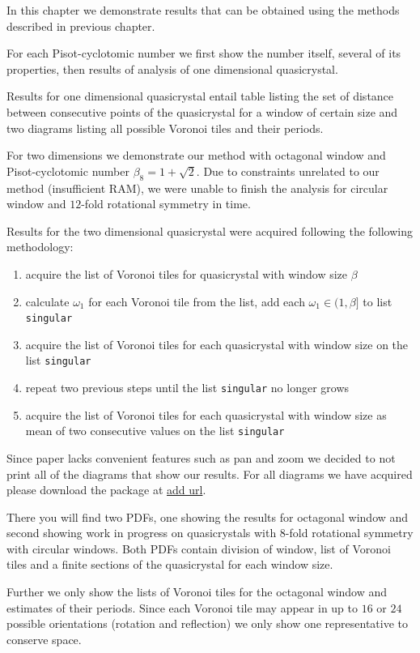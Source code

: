 \documentclass[text.tex]{subfiles}
\begin{document}
In this chapter we demonstrate results that can be obtained using the methods described in previous chapter. 

For each Pisot-cyclotomic number we first show the number itself, several of its properties, then results of analysis of one dimensional quasicrystal.

Results for one dimensional quasicrystal entail table listing the set of distance between consecutive points of the quasicrystal for a window of certain size and two diagrams listing all possible Voronoi tiles and their periods. 

For two dimensions we demonstrate our method with octagonal window and Pisot-cyclotomic number $\beta_8 = 1+\sqrt{2}$. Due to constraints unrelated to our method (insufficient RAM), we were unable to finish the analysis for circular window and $12$-fold rotational symmetry in time. 

Results for the two dimensional quasicrystal were acquired following the following methodology:
\begin{enumerate}
\item acquire the list of Voronoi tiles for quasicrystal with window size $\beta$
\item calculate $\omega_1$ for each Voronoi tile from the list, add each $\omega_1\in(1,\beta]$ to list \texttt{singular}
\item acquire the list of Voronoi tiles for each quasicrystal with window size on the list \texttt{singular}
\item repeat two previous steps until the list \texttt{singular} no longer grows
\item acquire the list of Voronoi tiles for each quasicrystal with window size as mean of two consecutive values on the list \texttt{singular}
\end{enumerate}

Since paper lacks convenient features such as pan and zoom we decided to not print all of the diagrams that show our results. For all diagrams we have acquired please download the package at \url{add url}. 

There you will find two PDFs, one showing the results for octagonal window and second showing work in progress on quasicrystals with $8$-fold rotational symmetry with circular windows. Both PDFs contain division of window, list of Voronoi tiles and a finite sections of the quasicrystal for each window size. 

Further we only show the lists of Voronoi tiles for the octagonal window and estimates of their periods. Since each Voronoi tile may appear in up to $16$ or $24$ possible orientations (rotation and reflection) we only show one representative to conserve space.
\end{document}
